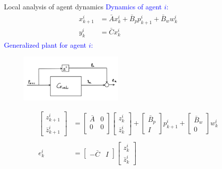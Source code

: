 \begin{frame}{Local analysis of agent dynamics}
\textcolor{blue}{Dynamics of agent $i$:}
\begin{equation*}
\begin{split}	
\begin{array}{ll}
x^i_{k+1}&=\bar{A}x^i_k+\bar{B}_pp^i_{k+1} + \bar{B}_ww^i_k \\
y^i_k &=\bar{C}x^i_k 
\end{array}
\end{split}
\end{equation*}
\pause
\textcolor{blue}{Generalized plant for agent $i$:}
\begin{figure}
	\includegraphics[width=0.45\textwidth]{figures/gen_plant_tf.png}
\end{figure}
\begin{equation*}\label{complete_closed_loop_aug_system}
\begin{split}
\begin{bmatrix}
z^i_{k+1}\\
\bar{z}^i_{k+1}
\end{bmatrix}
&=
\begin{bmatrix}
\bar{A} & 0\\
0 & 0\\
\end{bmatrix}
\begin{bmatrix}
z^i_k\\
\bar{z}^i_k
\end{bmatrix}
+
\begin{bmatrix}
\bar{B}_p\\
I 
\end{bmatrix}
p^i_{k+1}
+
\begin{bmatrix}
\bar{B}_w\\
0
\end{bmatrix}
w^i_k\\
\\
e^i_k &=
\begin{bmatrix}
-\bar{C} & I
\end{bmatrix}
\begin{bmatrix}
z^i_k\\
\bar{z}^i_k
\end{bmatrix}
\end{split}
\end{equation*}
\end{frame}
